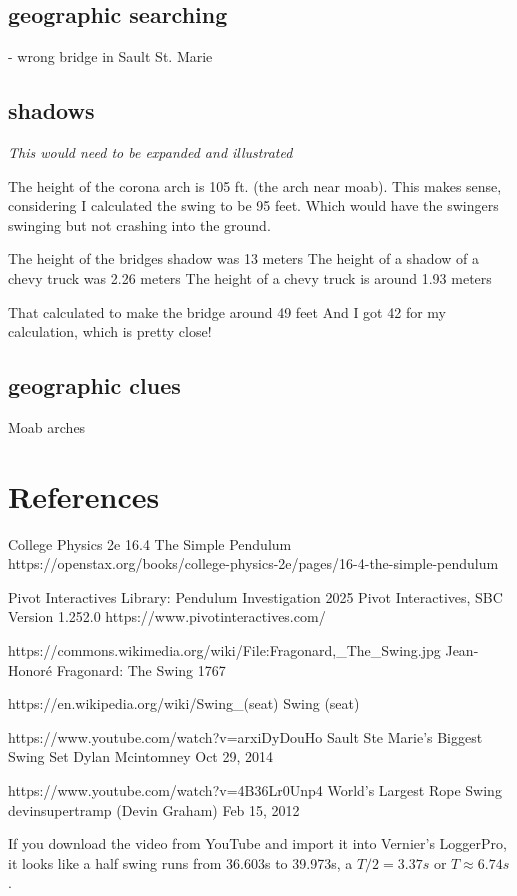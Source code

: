 \documentclass[12pt]{iopart}
\begin{document}
\subsection{geographic searching}
- wrong bridge in Sault St. Marie

\subsection{shadows}


\textit{This would need to be expanded and illustrated}

The height of the corona arch is 105 ft. (the arch near moab). This makes sense, considering I calculated the swing to be 95 feet. Which would have the swingers swinging but not crashing into the ground.  

 The height of the bridges shadow was 13 meters 
The height of a shadow of a chevy truck was 2.26 meters  
The height of a chevy truck is around 1.93 meters  

That calculated to make the bridge around 49 feet And I got 42 for my calculation, which is pretty close! 

\subsection{geographic clues}
Moab arches

\clearpage
\section*{References}
\begin{thebibliography}{99}

College Physics 2e
16.4 The Simple Pendulum
https://openstax.org/books/college-physics-2e/pages/16-4-the-simple-pendulum

Pivot Interactives Library: Pendulum Investigation
2025 Pivot Interactives, SBC
Version 1.252.0
https://www.pivotinteractives.com/


	https://commons.wikimedia.org/wiki/File:Fragonard,\_The\_Swing.jpg
	Jean-Honoré Fragonard: The Swing 
	1767

	https://en.wikipedia.org/wiki/Swing\_(seat)
		Swing (seat)

https://www.youtube.com/watch?v=arxiDyDouHo
Sault Ste Marie's Biggest Swing Set
Dylan Mcintomney
Oct 29, 2014

https://www.youtube.com/watch?v=4B36Lr0Unp4
World's Largest Rope Swing
devinsupertramp (Devin Graham)
Feb 15, 2012

 If you download the video from YouTube and import it into Vernier's LoggerPro, it looks like a half swing runs from 36.603s to 39.973s, a $T/2=3.37s$ or $T\approx6.74s$.  
\end{thebibliography}
\end{document}
